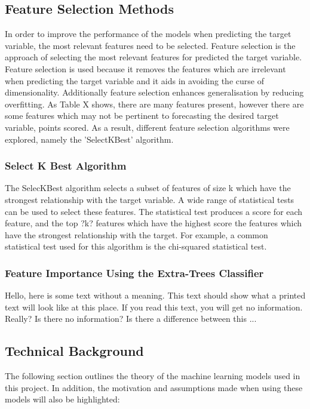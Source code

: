 \documentclass[a4paper,11pt,twoside]{article}
\begin{document}
\subsection{Feature Selection Methods}
In order to improve the performance of the models when predicting the target variable, the most relevant features need to be selected. Feature selection is the approach of selecting the most relevant features for predicted the target variable. Feature selection is used because it removes the features which are irrelevant when predicting the target variable and it aids in avoiding the curse of dimensionality. Additionally feature selection enhances generalisation by reducing overfitting. As Table X shows, there are many features present, however there are some features which may not be pertinent to forecasting the desired target variable, points scored. As a result, different feature selection algorithms were explored, namely the 'SelectKBest' algorithm.


\subsubsection{Select K Best Algorithm}
The SelecKBest algorithm selects a subset of features of size k which have the strongest relationship with the target variable. A wide range of statistical tests can be used to select these features. The statistical test produces a score for each feature, and the top ?k? features which have the highest score the features which have the strongest relationship with the target. For example, a common statistical test used for this algorithm is the chi-squared statistical test.  

 \subsubsection{Feature Importance Using the Extra-Trees Classifier}
 Hello,  here  is  some  text  without  a  meaning.   This  
text  should  show  what  a printed text will look like at 
this place.  If you read this text, you will get no information.  
Really?  Is there no information?  Is there a difference between 
this ... 


\subsection{Technical Background}
The following section outlines the theory of the machine learning models used in this project. In addition, the motivation and assumptions made when using these models will also be highlighted:
\end{document}
